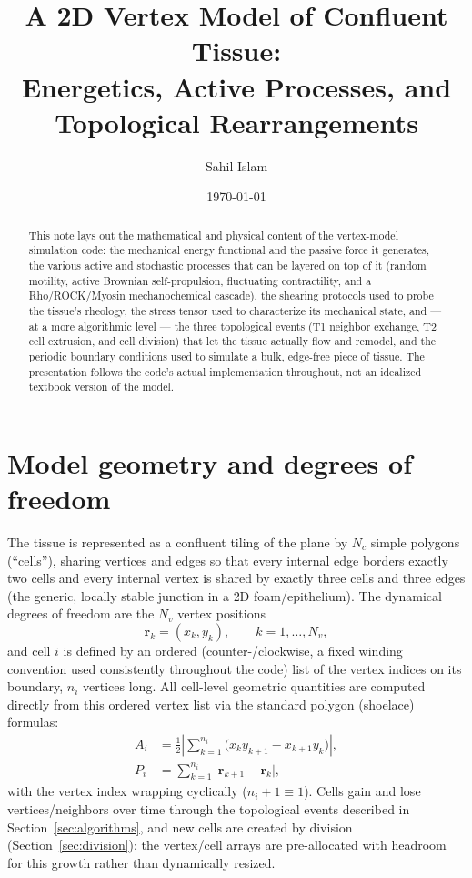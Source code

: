 \documentclass[11pt]{article}
\title{\textbf{A 2D Vertex Model of Confluent Tissue:\\ Energetics, Active Processes, and Topological Rearrangements}}
\author{Sahil Islam}
\date{\today}
\newcommand{\rvec}{\mathbf{r}}
\begin{document}
\maketitle

\begin{abstract}
\noindent This note lays out the mathematical and physical content of the vertex-model
simulation code: the mechanical energy functional and the passive force it generates,
the various active and stochastic processes that can be layered on top of it (random
motility, active Brownian self-propulsion, fluctuating contractility, and a
Rho/ROCK/Myosin mechanochemical cascade), the shearing protocols used to probe the
tissue's rheology, the stress tensor used to characterize its mechanical state, and
--- at a more algorithmic level --- the three topological events (T1 neighbor exchange,
T2 cell extrusion, and cell division) that let the tissue actually flow and remodel, and
the periodic boundary conditions used to simulate a bulk, edge-free piece of tissue. The
presentation follows the code's actual implementation throughout, not an idealized
textbook version of the model.
\end{abstract}

\tableofcontents

\section{Model geometry and degrees of freedom}

The tissue is represented as a confluent tiling of the plane by $N_c$ simple polygons
(``cells''), sharing vertices and edges so that every internal edge borders exactly two
cells and every internal vertex is shared by exactly three cells and three edges (the
generic, locally stable junction in a 2D foam/epithelium). The dynamical degrees of
freedom are the $N_v$ vertex positions
\[
  \rvec_k = (x_k, y_k), \qquad k = 1, \dots, N_v,
\]
and cell $i$ is defined by an ordered (counter-/clockwise, a fixed winding convention
used consistently throughout the code) list of the vertex indices on its boundary,
$n_i$ vertices long. All cell-level geometric quantities are computed directly from
this ordered vertex list via the standard polygon (shoelace) formulas:
\begin{align}
  A_i &= \frac{1}{2}\left|\sum_{k=1}^{n_i} \big(x_k y_{k+1} - x_{k+1} y_k\big)\right|,
  \label{eq:shoelace-area}\\
  P_i &= \sum_{k=1}^{n_i} \big|\rvec_{k+1} - \rvec_k\big|, \label{eq:shoelace-perimeter}
\end{align}
with the vertex index wrapping cyclically ($n_i{+}1 \equiv 1$). Cells gain and lose
vertices/neighbors over time through the topological events described in
Section~\ref{sec:algorithms}, and new cells are created by division
(Section~\ref{sec:division}); the vertex/cell arrays are pre-allocated with headroom
for this growth rather than dynamically resized.
\end{document}
